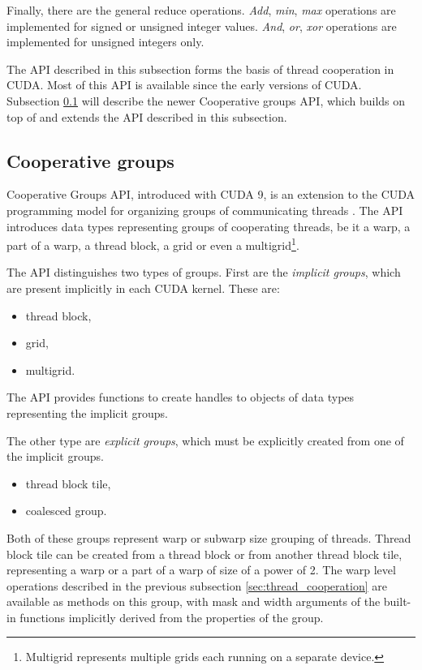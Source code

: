 Finally, there are the general reduce operations. \textit{Add}, \textit{min}, \textit{max} operations are implemented for signed or unsigned integer values. \textit{And}, \textit{or}, \textit{xor} operations are implemented for unsigned integers only.

The API described in this subsection forms the basis of thread cooperation in CUDA. Most of this API is available since the early versions of CUDA. Subsection \ref{sec:cooperative_groups} will describe the newer Cooperative groups API, which builds on top of and extends the API described in this subsection.

\subsection{Cooperative groups}
\label{sec:cooperative_groups}

Cooperative Groups API, introduced with CUDA 9, is an extension to the CUDA programming model for organizing groups of communicating threads \citep{site:cuda}. The API introduces data types representing groups of cooperating threads, be it a warp, a part of a warp, a thread block, a grid or even a multigrid\footnote{Multigrid represents multiple grids each running on a separate device.}.


The API distinguishes two types of groups. First are the \textit{implicit groups}, which are present implicitly in each CUDA kernel. These are:

\begin{itemize}
	\item thread block,
	\item grid,
	\item multigrid.
\end{itemize}

The API provides functions to create handles to objects of data types representing the implicit groups. 

The other type are \textit{explicit groups}, which must be explicitly created from one of the implicit groups. 

\begin{itemize}
	\item thread block tile,
	\item coalesced group.
\end{itemize}

Both of these groups represent warp or subwarp size grouping of threads. Thread block tile can be created from a thread block or from another thread block tile, representing a warp or a part of a warp of size of a power of 2. The warp level operations described in the previous subsection \ref{sec:thread_cooperation} are available as methods on this group, with mask and width arguments of the built-in functions implicitly derived from the properties of the group. 

